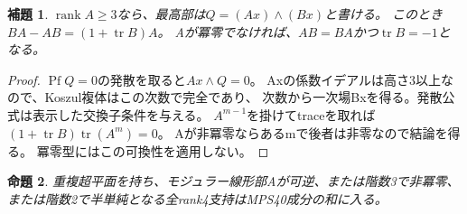 \documentclass[a4paper,11pt]{ltjsarticle}
\newtheorem{proposition}{命題}[section]
\newtheorem{lemma}[proposition]{補題}
\theoremstyle{definition}
\begin{document}
\begin{lemma}\label{lem:modular-koszul}
$\operatorname{rank}A\ge3$なら、最高部は$Q=(Ax)\wedge(Bx)$と書ける。
このとき$BA-AB=(1+\operatorname{tr}B)A$。
Aが冪零でなければ、$AB=BA$かつ$\operatorname{tr}B=-1$となる。
\end{lemma}
\begin{proof}
$\operatorname{Pf}Q=0$の発散を取ると$Ax\wedge Q=0$。
Axの係数イデアルは高さ3以上なので、Koszul複体はこの次数で完全であり、
次数から一次場Bxを得る。発散公式は表示した交換子条件を与える。
$A^{m-1}$を掛けてtraceを取れば
$(1+\operatorname{tr}B)\operatorname{tr}(A^m)=0$。
Aが非冪零ならあるmで後者は非零なので結論を得る。
冪零型にはこの可換性を適用しない。
\end{proof}

\begin{proposition}\label{prop:modular-nonnil}
重複超平面を持ち、モジュラー線形部Aが可逆、または階数3で非冪零、
または階数2で半単純となる全rank4支持はMPS40成分の和に入る。
\end{proposition}
\end{document}

